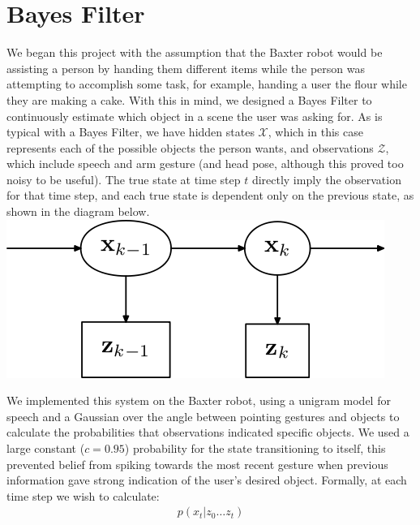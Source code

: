 \documentclass[a4paper, 11pt]{article} %
\begin{document}
\section*{Bayes Filter}
We began this project with the assumption that the Baxter robot would be assisting a person by handing them different items while the person was attempting to accomplish some task, for example, handing a user the flour while they are making a cake. With this in mind, we designed a Bayes Filter to continuously estimate which object in a scene the user was asking for. As is typical with a Bayes Filter, we have hidden states $\mathcal{X}$, which in this case represents each of the possible objects the person wants, and observations $\mathcal{Z}$, which include speech and arm gesture (and head pose, although this proved too noisy to be useful). The true state at time step $t$ directly imply the observation for that time step, and  each true state is dependent only on the previous state, as shown in the diagram below.\\
\includegraphics[scale=0.4]{images/bayes_filter}


We implemented this system on the Baxter robot, using a unigram model for speech and a Gaussian over the angle between pointing gestures and objects to calculate the probabilities that observations indicated specific objects. We used a large constant ($c=0.95$) probability for the state transitioning to itself, this prevented belief from spiking towards the most recent gesture when previous information gave strong indication of the user's desired object. Formally, at each time step we wish to calculate:
\begin{align}
 p(x_t | z_0 \dots z_{t})
\end{align}
\end{document}
